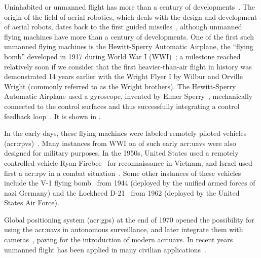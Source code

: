 Uninhabited or unmanned flight has more than a century of developments~\citep{siciliano2016springer}. The origin of the field of aerial robotics, which deals with the design and development of aerial robots, dates back to the first guided missiles~\citep{siciliano2016springer}, although unmanned flying machines have more than a century of developments. One of the first such unmanned flying machines is the Hewitt-Sperry Automatic Airplane, the ``flying bomb'' developed in 1917 during World War I (WWI)~\citep{keane2013brief,valavanis2015handbook}; a milestone reached relatively soon if we consider that the first heavier-than-air flight in history was demonstrated 14 years earlier with the Wright Flyer I by Wilbur and Orville Wright (commonly referred to as the Wright brothers). The Hewitt-Sperry Automatic Airplane used a gyroscope, invented by Elmer Sperry~\citep{keane2013brief}, mechanically connected to the control surfaces and thus successfully integrating a control feedback loop~\citep{siciliano2016springer}. It is shown in .

In the early days, these flying machines were labeled remotely piloted vehicles (\Gls{acr:rpv}s)~\citep{anderson2005introduction}. Many instances from WWI on of such early \Gls{acr:uav}s were also designed for military purposes. In the 1950s, United States used a remotely controlled vehicle Ryan Firebee~ for reconnaissance in Vietnam, and Israel used first a \Gls{acr:rpv} in a combat situation~\citep{anderson2005introduction}. Some other instances of these vehicles include the V-1 flying bomb~ from 1944 (deployed by the unified armed forces of nazi Germany) and the Lockheed D-21~ from 1962 (deployed by the United States Air Force).

Global positioning system (\Gls{acr:gps}) at the end of 1970 opened the possibility for using the \Gls{acr:uav}s in autonomous surveillance, and later integrate them with cameras~\citep{siciliano2016springer}, paving for the introduction of modern \Gls{acr:uav}s. In recent years unmanned flight has been applied in many civilian applications~\citep{gonzalez2017unmanned}. 

